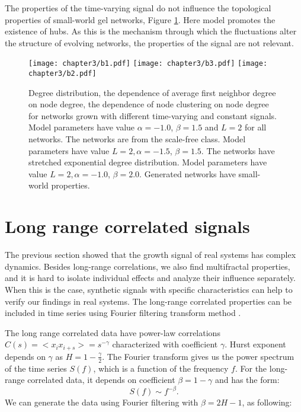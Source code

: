 The properties of the time-varying signal do not influence the topological properties of small-world gel networks, Figure \ref{fig:properties_net}. Here model promotes the existence of hubs. As this is the mechanism through which the fluctuations alter the structure of evolving networks, the properties of the signal are not relevant.   

\begin{figure}[H]
	\centering
	\texttt{[image: chapter3/b1.pdf]}
	\texttt{[image: chapter3/b3.pdf]}
	\texttt{[image: chapter3/b2.pdf]}
	\caption[Structural properties of networks.]{Degree distribution, the dependence of average first neighbor degree on node degree, the dependence of node clustering on node degree for networks grown with different time-varying and constant signals. Model parameters have value $\alpha=-1.0$, $\beta=1.5$  and $L=2$ for all networks. The networks are from the scale-free class. Model parameters have value $L=2, \alpha=-1.5$, $\beta=1.5$. The networks have stretched exponential degree distribution. Model parameters have value $ L=2, \alpha=-1.0$, $\beta=2.0$. Generated networks have small-world properties.}
	\label{fig:properties_net}
\end{figure}

\section{Long range correlated signals}

The previous section showed that the growth signal of real systems has complex dynamics. Besides long-range correlations, we also find multifractal properties, and it is hard to isolate individual effects and analyze their influence separately. When this is the case, synthetic signals with specific characteristics can help to verify our findings in real systems. The long-range correlated properties can be included in time series using Fourier filtering transform method \cite{makse1996method}. 

The long range correlated data have power-law correlations $C(s)= <x_i x_{i+s}> = s ^ {-\gamma}$ characterized with coefficient $\gamma$. Hurst exponent depends on $\gamma$ as  $H = 1- \frac{\gamma}{2}$. The Fourier transform gives us the power spectrum of the time series $S(f)$, which is a function of the frequency $f$. For the long-range correlated data, it depends on coefficient $\beta = 1-\gamma$ and has the form:
\begin{equation}
S(f) \sim f^{-\beta}.
\end{equation}
We can generate the data using Fourier filtering with $\beta = 2H - 1$, as following:


